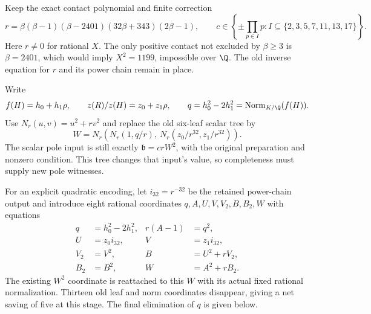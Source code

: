 Keep the exact contact polynomial and finite correction
\[
 r=\beta(\beta-1)(\beta-2401)(32\beta+343)(2\beta-1),\qquad
 c\in\left\{\pm\prod_{p\in I}p:
 I\subseteq\{2,3,5,7,11,13,17\}\right\}.
\]
Here $r\ne0$ for rational $X$.  The only positive contact not excluded
by $\beta\ge3$ is $\beta=2401$, which would imply $X^2=1199$,
impossible over $\Q$.  The old inverse equation for $r$ and its
power chain remain in place.

Write
\[
 f(H)=h_0+h_1\rho,\qquad z(R)/z(H)=z_0+z_1\rho,
 \qquad q=h_0^2-2h_1^2=\operatorname{Norm}_{K/\Q}(f(H)).
\]
Use $N_r(u,v)=u^2+rv^2$ and replace the old six-leaf scalar tree by
\begin{equation}\label{eq:v12-scalar-tree}
 W=N_r\left(N_r(1,q/r),\ N_r(z_0/r^{32},z_1/r^{32})\right).
\end{equation}
The scalar pole input is still exactly $\mathfrak b=crW^2$, with the
original preparation and nonzero condition.  This tree changes that
input's value, so completeness must supply new pole witnesses.

For an explicit quadratic encoding, let $i_{32}=r^{-32}$ be the
retained power-chain output and introduce eight rational coordinates
$q,A,U,V,V_2,B,B_2,W$ with equations
\begin{equation}\label{eq:v12-scalar-eight}
\begin{aligned}
 q&=h_0^2-2h_1^2,& r(A-1)&=q^2,\\
 U&=z_0i_{32},&V&=z_1i_{32},\\
 V_2&=V^2,&B&=U^2+rV_2,\\
 B_2&=B^2,&W&=A^2+rB_2.
\end{aligned}
\end{equation}
The existing $W^2$ coordinate is reattached to this $W$ with its
actual fixed rational normalization.  Thirteen old leaf and norm
coordinates disappear, giving a net saving of five at this stage.
The final elimination of $q$ is given below.

